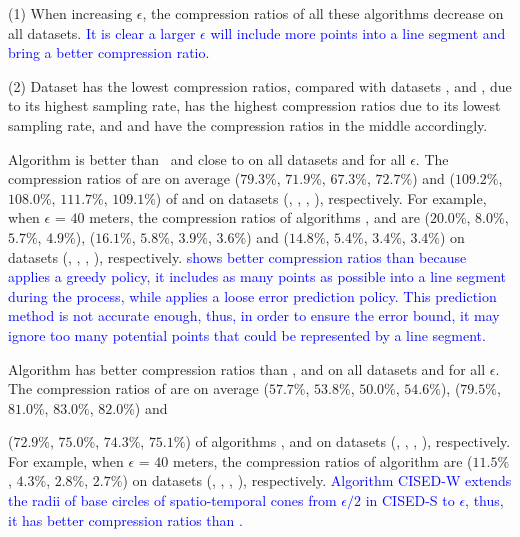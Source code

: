 {\ni (1) When increasing $\epsilon$, the compression ratios of all these algorithms decrease on all datasets.
\textcolor{blue}{It is clear a larger $\epsilon$ will include more points into a line segment and bring a better compression ratio.}

\ni (2) Dataset \pricar has the lowest compression ratios, compared with datasets \mopsi, \sercar and \geolife, due to its highest sampling rate,
\sercar has the highest compression ratios due to its lowest sampling rate, and \geolife and \mopsi have the compression ratios in the middle accordingly.

 Algorithm \cist is better than \squishe ~{and close to} \dps on all datasets and for all $\epsilon$.
%
The compression ratios of \cist are on average {($79.3\%$, $71.9\%$, $67.3\%$, $72.7\%$) and ($109.2\%$, $108.0\%$, $111.7\%$, $109.1\%$)} of \squishe and
\dps on {datasets (\sercar, \geolife, \mopsi, \pricar)}, respectively.
For example, when $\epsilon$ = $40$ meters, the compression ratios of algorithms
\squishe, \cist and \dps are
{($20.0\%$, $8.0\%$, $5.7\%$, $4.9\%$), ($16.1\%$, $5.8\%$, $3.9\%$, $3.6\%$) and ($14.8\%$, $5.4\%$, $3.4\%$, $3.4\%$)} on  {datasets (\sercar, \geolife, \mopsi, \pricar)}, respectively.
\textcolor{blue}{\cist shows better compression ratios than \squishe because \cist applies a greedy policy, \ie it includes as many points as possible into a line segment during the process, while \squishe applies a loose error prediction policy. This prediction method is not accurate enough, thus, in order to ensure the error bound, it may ignore too many potential points that could be represented by a line segment.}


 Algorithm \cista has better compression ratios than \dps, \squishe and \cist on all datasets and for all $\epsilon$.
The compression ratios of \cista are on average ($57.7\%$, $53.8\%$, $50.0\%$, $54.6\%$), ($79.5\%$, $81.0\%$, $83.0\%$, $82.0\%$) and {($72.9\%$, $75.0\%$, $74.3\%$, $75.1\%$) of algorithms
\squishe, \dps and \cist on {datasets (\sercar, \geolife, \mopsi, \pricar)}, respectively.
For example, when $\epsilon$ = $40$ meters, the compression ratios of algorithm
\cista are ($11.5\%$, $4.3\%$, $2.8\%$, $2.7\%$) on datasets (\sercar, \geolife, \mopsi, \pricar), respectively.
%
\textcolor{blue}{Algorithm CISED-W extends the radii of base circles of spatio-temporal cones from $\epsilon/2$ in CISED-S to $\epsilon$, thus, it has better compression ratios than \cist.}

}}
